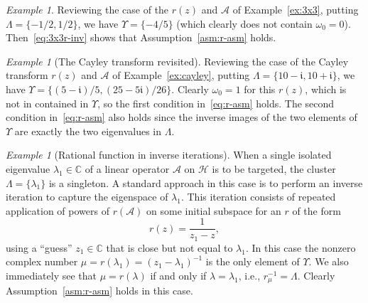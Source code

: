 \documentclass[12pt, oneside, reqno]{amsart}
\theoremstyle{remark}
\newtheorem{example}[theorem]{Example}
\newcommand{\ii}{\mathfrak{i}}
\newcommand{\CC}{\mathbb{C}}
\newcommand{\vL}{\varLambda}
\newcommand{\vU}{\varUpsilon}
\newcommand{\Ac}{\mathcal{A}}
\newcommand{\Hc}{\mathcal{H}}
\newcommand{\og}{\omega}
\begin{document}
\begin{example}
  Reviewing the case of the $r(z)$ and $\Ac$ of Example~\ref{ex:3x3},
  putting $\vL = \{-1/2, 1/2\}$, we have $\vU = \{-4/5\}$ (which
  clearly does not contain $\og_0=0$).  Then~\eqref{eq:3x3r-inv} shows
  that Assumption~\ref{asm:r-asm} holds.
\end{example}

\begin{example}[The Cayley transform revisited]
  Reviewing the case of the Cayley transform $r(z)$ and $\Ac$ of
  Example~\ref{ex:cayley}, putting $\vL = \{10 - \ii, 10 + \ii\}$, we have
  $\vU = \{ (5 - \ii)/5, (25 - 5\ii)/26\}$. Clearly $\og_0 = 1$ for this $r(z)$, which is not in contained in $\vU$, so the  first condition
  in~\eqref{eq:r-asm} holds.  The second
  condition in~\eqref{eq:r-asm} also holds since the inverse images
  of the two elements of $\vU$ are exactly the two eigenvalues in
  $\vL$.
\end{example}

\begin{example}[Rational function in inverse iterations]
  When a single isolated eigenvalue $\lambda_1 \in \CC$ of a linear
  operator $\Ac$ on $\Hc$ is to be targeted, the cluster
  $\vL =\{ \lambda_1\}$ is a singleton.  A standard approach in this
  case is to perform an inverse iteration to capture the eigenspace of
  $\lambda_1$. This iteration consists of repeated application of
  powers of $r(\Ac)$ on some initial subspace for an $r$ of the form
  \[
    r(z) = \frac{1}{ z_1 -z},
  \]
  using a ``guess'' $z_1 \in \CC$ that is close but not equal to
  $\lambda_1$.  In this case the nonzero complex number
  $\mu = r(\lambda_1) = (z_1 - \lambda_1)^{-1}$ is the only element of
  $\vU$.  We also immediately see that $\mu = r(\lambda)$ if and only
  if $\lambda = \lambda_1$, i.e., $r_\mu^{-1} = \vL$.  Clearly
  Assumption~\ref{asm:r-asm} holds in this case.
\end{example}
\end{document}
